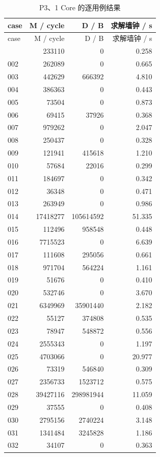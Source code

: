 \documentclass[anonymous,notoc]{gmcm2026}
\begin{document}
\begin{longtable}{lrrr}
\caption{P3、1 Core 的逐用例结果}\\
\toprule
case & M / cycle & D / B & 求解墙钟 / s\\\midrule
\endfirsthead
\toprule
case & M / cycle & D / B & 求解墙钟 / s\\\midrule
\endhead
\bottomrule\endfoot
001 & 233110 & 0 & 0.258 \\
002 & 262089 & 0 & 0.665 \\
003 & 442629 & 666392 & 4.810 \\
004 & 386363 & 0 & 0.443 \\
005 & 73504 & 0 & 0.873 \\
006 & 69415 & 37926 & 0.368 \\
007 & 979262 & 0 & 2.047 \\
008 & 250437 & 0 & 0.328 \\
009 & 121941 & 415618 & 1.210 \\
010 & 57684 & 22016 & 0.299 \\
011 & 184697 & 0 & 0.342 \\
012 & 36348 & 0 & 0.471 \\
013 & 263949 & 0 & 0.986 \\
014 & 17418277 & 105614592 & 51.335 \\
015 & 112496 & 958548 & 0.448 \\
016 & 7715523 & 0 & 6.639 \\
017 & 111608 & 295056 & 0.661 \\
018 & 971704 & 564224 & 1.161 \\
019 & 51676 & 0 & 0.410 \\
020 & 532746 & 0 & 3.670 \\
021 & 6349969 & 35901440 & 2.182 \\
022 & 55127 & 374808 & 0.535 \\
023 & 78947 & 548872 & 0.556 \\
024 & 2555343 & 0 & 1.197 \\
025 & 4703066 & 0 & 20.977 \\
026 & 73319 & 546840 & 0.309 \\
027 & 2356733 & 1523712 & 0.575 \\
028 & 39427116 & 298981944 & 11.059 \\
029 & 37555 & 0 & 0.408 \\
030 & 2795156 & 2740224 & 3.148 \\
031 & 1341484 & 3245828 & 1.186 \\
032 & 34107 & 0 & 0.363 \\

\end{longtable}
\end{document}
